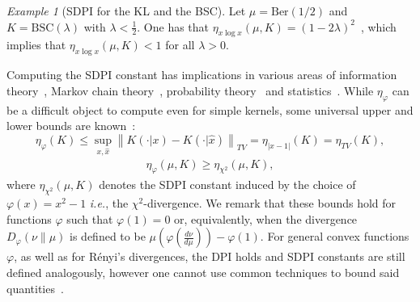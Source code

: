 \documentclass[11pt]{article}
\theoremstyle{plain}
\theoremstyle{remark}
\newtheorem{example}{Example}
\begin{document}
 \begin{example}[SDPI for the KL and the BSC] 
     Let $\mu=\text{Ber}(1/2)$ and $K=\text{BSC}(\lambda)$ with $\lambda<\frac12$. One has that $\eta_{x\log x}(\mu,K)=(1-2\lambda)^2$~\cite{spreadingOfSetsHypercontractivity}, which implies that  $\eta_{x\log x}(\mu,K) < 1$ for all $\lambda>0$.
 \end{example} 
 Computing the SDPI constant has implications in various areas of information theory~\cite{contractionInputConstraint, sdpiRaginsky}, Markov chain theory~\cite{sdpiRaginsky,mcmcThesis, spreadingOfSetsHypercontractivity, contractionLedoux}, probability theory~\cite{concentrationMeasureII, esposito2024concentration} and statistics~\cite{bayesRiskRaginsky, esposito2023lower}.
 While $\eta_\varphi$ can be a difficult object to compute even for simple kernels, some universal upper and lower bounds are known~\cite[Theorems 3.1, 3.3]{sdpiRaginsky}:
 \begin{equation}
 \eta_\varphi(K) \leq \sup_{x,\hat{x}} \left\lVert K(\cdot|x)-K(\cdot|\hat{x})\right\rVert_{TV} = \eta_{|x-1|}(K)=\eta_{TV}(K), \label{eq:etaTV}
 \end{equation}
  \begin{align}
 \eta_\varphi(\mu,K) \geq  \eta_{\chi^2}(\mu,K), \label{eq:universalLower} \end{align}
 where $\eta_{\chi^2}(\mu,K)$ denotes the SDPI constant induced by the choice of $\varphi(x)=x^2-1$ \textit{i.e.}, the $\chi^2$-divergence.
 We remark that these bounds hold for functions $\varphi$ such that $\varphi(1)=0$ or, equivalently, when the divergence $D_\varphi(\nu\|\mu)$ is defined to be $\mu\left(\varphi\left(\frac{d\nu}{d\mu}\right)\right)-\varphi(1)$. For general convex functions $\varphi$, as well as for R\'enyi's divergences, the DPI holds and SDPI constants are still defined analogously, however one cannot use common techniques to bound said quantities~\cite[Example 2]{esposito2024concentration}.
\end{document}
